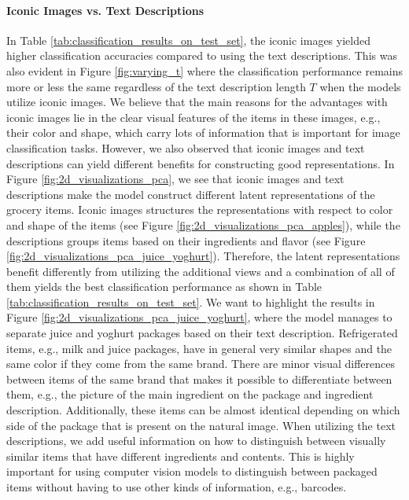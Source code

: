 \vspace{-3mm}
\paragraph{Iconic Images vs. Text Descriptions} 
In Table \ref{tab:classification_results_on_test_set}, the iconic images yielded higher classification accuracies compared to using the text descriptions. This was also evident in Figure \ref{fig:varying_t} where the classification performance remains more or less the same regardless of the text description length $T$ when the models utilize iconic images. We believe that the main reasons for the advantages with iconic images lie in the clear visual features of the items in these images, e.g., their color and shape, which carry lots of information that is important for image classification tasks. However, we also observed that iconic images and text descriptions can yield different benefits for constructing good representations. In Figure \ref{fig:2d_visualizations_pca}, we see that iconic images and text descriptions make the model construct different latent representations of the grocery items. Iconic images structures the representations with respect to color and shape of the items (see Figure \ref{fig:2d_visualizations_pca_apples}), while the descriptions groups items based on their ingredients and flavor (see Figure \ref{fig:2d_visualizations_pca_juice_yoghurt}). Therefore, the latent representations benefit differently from utilizing the additional views and a combination of all of them yields the best classification performance as shown in Table \ref{tab:classification_results_on_test_set}. We want to highlight the results in Figure \ref{fig:2d_visualizations_pca_juice_yoghurt}, where the model manages to separate juice and yoghurt packages based on their text description. 
Refrigerated items, e.g., milk and juice packages, have in general very similar shapes and the same color if they come from the same brand.
There are minor visual differences between items of the same brand that makes it possible to differentiate between them, e.g., the picture of the main ingredient on the package and ingredient description. Additionally, these items can be almost identical depending on which side of the package that is present on the natural image. When utilizing the text descriptions, we add useful information on how to distinguish between visually similar items that have different ingredients and contents. This is highly important for using computer vision models to distinguish between packaged items without having to use other kinds of information, e.g., barcodes. 

